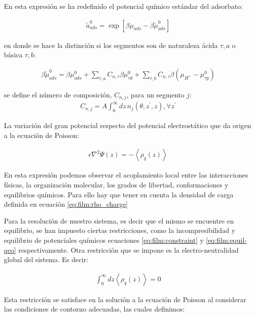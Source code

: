 En esta expresi\'on se ha redefinido el potencial qu\'imico est\'andar del adsorbato:

\begin{align}
	\tilde{a}^0_{ads} = \exp[\beta\mu_{ads} - \beta\tilde{\mu}^0_{ads}]
	\label{eq:film:actividad-pro}
\end{align}

\noindent en donde se hace la distinci\'on si los segmentos son de naturaleza \'acida $\tau, a$ o b\'asica $\tau,b$:

\begin{align}
	\beta\tilde{\mu}^0_{ads} =  \beta \mu^0_{ads}  + \sum_{\tau,a} C_{n,\tau}\beta\mu^0_{\tau d} 
	+ \sum_{\tau,b} C_{n,\tau}\beta(\mu_{H^+} - \mu^0_{\tau p})
\end{align}



\noindent se define el n\'umero de composici\'on, $C_{n,j}$, para un segmento $j$:
\begin{align}
	C_{n,j} = A\int_0^\infty dz \, n_j(\theta, z^\prime, z), \forall z^\prime
	\label{eq:film:n-coord}
\end{align}




La variaci\'on del gran potencial respecto del potencial electrost\'atico que da origen a la ecuaci\'on de Poisson:

\begin{align}
	\epsilon \nabla^2 \Psi(z) = - \left< \rho_q (z)\right>
\end{align}

En esta expresi\'on podemos observar  el acoplamiento local entre las interacciones f\'isicas, la organizaci\'on molecular, los grados de libertad, conformaciones y equilibrios qu\'imicos. Para ello hay que tener en cuenta la densidad de carga definida en ecuaci\'on \ref{eq:film:rho_charge} 

Para la resoluci\'on de nuestro sistema, es decir que el mismo  se encuentre en equilibrio, se han impuesto ciertas restricciones, como la incompresibilidad y equilibrio de potenciales qu\'imicos ecuaciones \ref{eq:film:constraint} y \ref{eq:film:equil-qco} respectivamente. Otra restricci\'on que se impone es la electro-neutralidad global del sistema. Es decir:

\begin{align}
	\int_0^\infty dz \left< \rho_q (z)\right> = 0
\end{align}

Esta restricci\'on se satisface en la soluci\'on a la ecuaci\'on de Poisson al considerar las condiciones de contorno adecuadas, las cuales definimos:

